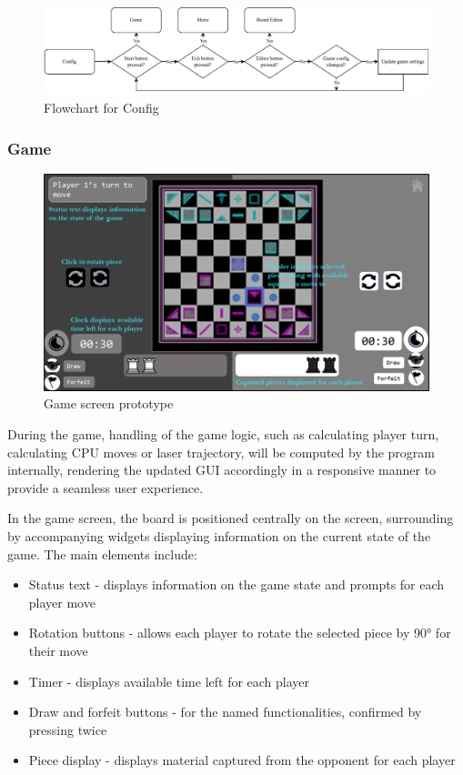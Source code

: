 \documentclass[../main/main.tex]{subfiles}
\begin{document}
\begin{figure}[ht!]
    \centering
    \includegraphics[width=\columnwidth]{../design/assets/config_flowchart.pdf}
    \caption{Flowchart for Config}
    \label{fig:config-flowchart}
\end{figure}

\subsubsection{Game}
\begin{figure}[ht!]
    \centering
    \includegraphics[width=0.8\columnwidth]{../design/assets/game_gui.png}
    \caption{Game screen prototype}
    \label{fig:game-gui}
\end{figure}

During the game, handling of the game logic, such as calculating player turn, calculating CPU moves or laser trajectory, will be computed by the program internally, rendering the updated GUI accordingly in a responsive manner to provide a seamless user experience.

In the game screen, the board is positioned centrally on the screen, surrounding by accompanying widgets displaying information on the current state of the game. The main elements include:

\begin{itemize}
\item Status text - displays information on the game state and prompts for each player move
\item Rotation buttons - allows each player to rotate the selected piece by 90° for their move
\item Timer - displays available time left for each player
\item Draw and forfeit buttons - for the named functionalities, confirmed by pressing twice
\item Piece display - displays material captured from the opponent for each player
\end{itemize}
\end{document}
